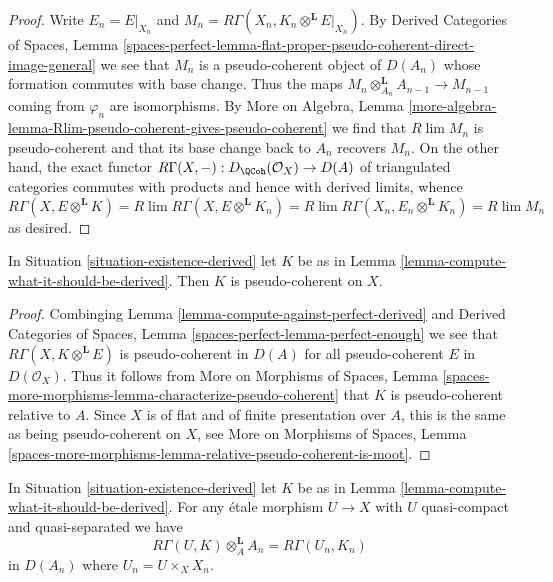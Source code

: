 \begin{proof}
Write $E_n = E|_{X_n}$ and
$M_n = R\Gamma(X_n, K_n \otimes^\mathbf{L} E|_{X_n})$.
By Derived Categories of Spaces, Lemma
\ref{spaces-perfect-lemma-flat-proper-pseudo-coherent-direct-image-general}
we see that $M_n$ is a pseudo-coherent object of $D(A_n)$
whose formation commutes with base change. Thus the maps
$M_n \otimes_{A_n}^\mathbf{L} A_{n - 1} \to M_{n - 1}$
coming from $\varphi_n$ are isomorphisms. By
More on Algebra, Lemma
\ref{more-algebra-lemma-Rlim-pseudo-coherent-gives-pseudo-coherent}
we find that $R\lim M_n$ is pseudo-coherent and
that its base change back to $A_n$ recovers $M_n$.
On the other hand, the exact functor
$R\Gamma(X, -) : D_\QCoh(\mathcal{O}_X) \to D(A)$
of triangulated categories commutes with products
and hence with derived limits, whence
$$
R\Gamma(X, E \otimes^\mathbf{L} K) =
R\lim R\Gamma(X,  E \otimes^\mathbf{L} K_n) =
R\lim R\Gamma(X_n, E_n \otimes^\mathbf{L} K_n) =
R\lim M_n
$$
as desired.
\end{proof}

\begin{lemma}
\label{lemma-relative-pseudo-coherence-derived}
In Situation \ref{situation-existence-derived} let $K$ be as in
Lemma \ref{lemma-compute-what-it-should-be-derived}. Then $K$
is pseudo-coherent on $X$.
\end{lemma}

\begin{proof}
Combinging Lemma \ref{lemma-compute-against-perfect-derived} and
Derived Categories of Spaces, Lemma
\ref{spaces-perfect-lemma-perfect-enough}
we see that $R\Gamma(X, K \otimes^\mathbf{L} E)$
is pseudo-coherent in $D(A)$ for all pseudo-coherent
$E$ in $D(\mathcal{O}_X)$. Thus it follows from
More on Morphisms of Spaces, Lemma
\ref{spaces-more-morphisms-lemma-characterize-pseudo-coherent}
that $K$ is pseudo-coherent relative to $A$.
Since $X$ is of flat and of finite presentation
over $A$, this is the same as being pseudo-coherent on $X$, see
More on Morphisms of Spaces, Lemma
\ref{spaces-more-morphisms-lemma-relative-pseudo-coherent-is-moot}.
\end{proof}

\begin{lemma}
\label{lemma-compute-over-affine-derived}
In Situation \ref{situation-existence-derived} let $K$ be as in
Lemma \ref{lemma-compute-what-it-should-be-derived}. For any
\'etale morphism $U \to X$ with $U$ quasi-compact and quasi-separated we have
$$
R\Gamma(U, K) \otimes_A^\mathbf{L} A_n =
R\Gamma(U_n, K_n)
$$
in $D(A_n)$ where $U_n = U \times_X X_n$.
\end{lemma}

